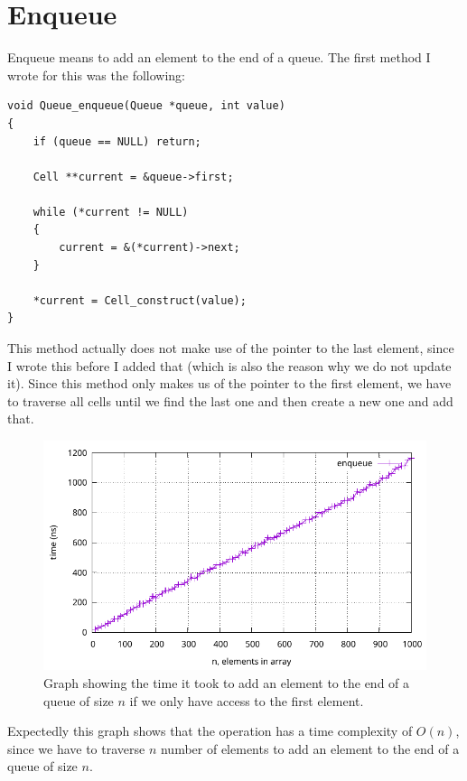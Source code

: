 \documentclass[a4paper, 11pt]{article}
\begin{document}
\section{Enqueue}
	Enqueue means to add an element to the end of a queue.
	The first method I wrote for this was the following:
	\begin{verbatim}
void Queue_enqueue(Queue *queue, int value)
{
	if (queue == NULL) return;

	Cell **current = &queue->first;

	while (*current != NULL)
	{
		current = &(*current)->next;
	}

	*current = Cell_construct(value);
}
	\end{verbatim}
	This method actually does not make use of the pointer to the last element, since I wrote this before I added that (which is also the reason why we do not update it).
	Since this method only makes us of the pointer to the first element, we have to traverse all cells until we find the last one and then create a new one and add that.
	\begin{figure}[H]
		\centering
		\includegraphics[scale=0.8]{graphs/enqueue.pdf}
		\caption{
			Graph showing the time it took to add an element to the end of a queue of size \(n\) if we only have access to the first element.
		}
	\end{figure}
	Expectedly this graph shows that the operation has a time complexity of \(O(n)\),
	since we have to traverse \(n\) number of elements to add an element to the end of a queue of size \(n\).
\end{document}
